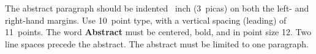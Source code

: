 The abstract paragraph should be indented ~inch (3~picas) on both the left- and right-hand margins. Use 10~point  type, with a vertical spacing (leading) of 11~points.  The word \textbf{Abstract} must be centered, bold, and in point size 12. Two line spaces precede the abstract. The abstract must be limited to one paragraph.